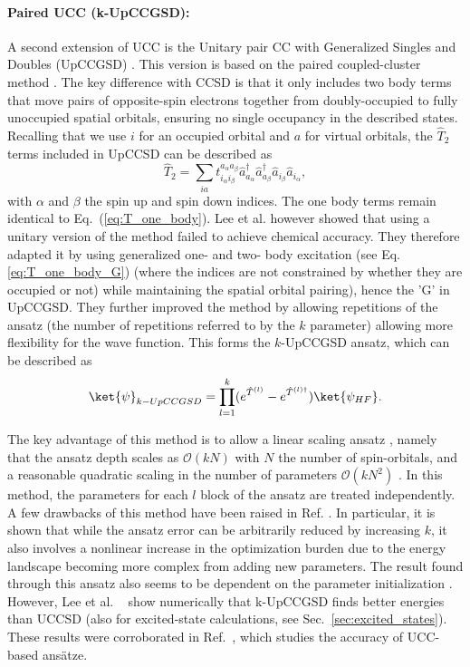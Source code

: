 \paragraph{Paired UCC (k-UpCCGSD):} A second extension of UCC is the Unitary pair CC with Generalized Singles and Doubles (UpCCGSD) \cite{Lee2019}. This version is based on the paired coupled-cluster method \cite{Stein2014, Limacher2013}. The key difference with CCSD is that it only includes two body terms that move pairs of opposite-spin electrons together from doubly-occupied to fully unoccupied spatial orbitals, ensuring no single occupancy in the described states. Recalling that we use $i$ for an occupied orbital and $a$ for virtual orbitals, the $\hat{T}_2$ terms included in UpCCSD can be described as
\begin{equation} \label{eq:T2_pair_CC}
    \hat{T}_2 = \sum_{ia} t_{i_{\alpha} i_{\beta}}^{a_{\alpha} a_{\beta}}\hat{a}^{\dagger}_{a_{\alpha}} \hat{a}^{\dagger}_{a_{\beta}} \hat{a}_{i_{\beta}} \hat{a}_{i_{\alpha}},
\end{equation}
with $\alpha$ and $\beta$ the spin up and spin down indices. The one body terms remain identical to Eq.~(\ref{eq:T_one_body}). Lee et al. \cite{Lee2019} however showed that using a unitary version of the method failed to achieve chemical accuracy. They therefore adapted it by using generalized one- and two- body excitation (see Eq. \ref{eq:T_one_body_G}) (where the indices are not constrained by whether they are occupied or not) while maintaining the spatial orbital pairing), hence the 'G' in UpCCGSD. They further improved the method by allowing repetitions of the ansatz (the number of repetitions referred to by the $k$ parameter) allowing more flexibility for the wave function. This forms the $k$-UpCCGSD ansatz, which can be described as
\begin{equation} \label{eq:kUpCCGSD}
    \ket{\psi}_{k-UpCCGSD} = \prod_{l=1}^k (e^{\hat{T}^{(l)}} - e^{\hat{T}^{(l)\dagger}}) \ket{\psi_{HF}}.
\end{equation}

The key advantage of this method is to allow a linear scaling ansatz \cite{Lee2019}, namely that the ansatz depth scales as $\mathcal{O}(kN)$ with $N$ the number of spin-orbitals, and a reasonable quadratic scaling in the number of parameters $\mathcal{O}(kN^2)$ \cite{Huggins2020}. In this method, the parameters for each $l$ block of the ansatz are treated independently. A few drawbacks of this method have been raised in Ref. \cite{Grimsley2019_UCC_Review}. In particular, it is shown that while the ansatz error can be arbitrarily reduced by increasing $k$, it also involves a nonlinear increase in the optimization burden due to the energy landscape becoming more complex from adding new parameters. The result found through this ansatz also seems to be dependent on the parameter initialization \cite{Grimsley2019_UCC_Review}.
However, Lee et al. ~\cite{Lee2019} show numerically that k-UpCCGSD finds better energies than UCCSD (also for excited-state calculations, see Sec.~\ref{sec:excited_states}). These results were corroborated in Ref.~\cite{GreeneDiniz2020}, which studies the accuracy of UCC-based ans{\"{a}}tze. 

